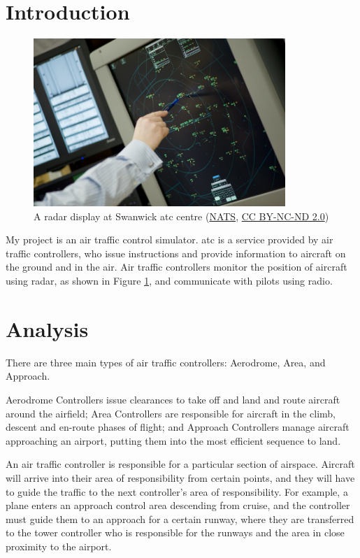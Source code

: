 \documentclass{article}
\begin{document}
\section{Introduction}
\begin{figure}[H]
\centering
\includegraphics[width=0.85\textwidth]{pictures/nats_radar.jpg}
\caption{\label{fig:radar}A radar display at Swanwick \acrshort{atc} centre (\href{https://www.nats.aero/}{NATS}, \href{https://creativecommons.org/licenses/by-nc-nd/2.0/}{CC BY-NC-ND 2.0})}
\end{figure}

My project is an air traffic control simulator.
\acrfull{atc} is a service provided by air traffic controllers, who issue instructions and provide information to aircraft on the ground and in the air.
Air traffic controllers monitor the position of aircraft using radar, as shown in Figure \ref{fig:radar}, and communicate with pilots using radio\cite{caadef}.


\section{Analysis}
There are three main types of air traffic controllers: Aerodrome, Area, and Approach.

Aerodrome Controllers issue clearances to take off and land and route aircraft around the airfield; Area Controllers are responsible for aircraft in the climb, descent and en-route phases of flight; and Approach Controllers manage aircraft approaching an airport, putting them into the most efficient sequence to land\cite{natscareers}.

An air traffic controller is responsible for a particular section of \gls{airspace}.
Aircraft will arrive into their area of responsibility from certain points, and they will have to guide the traffic to the next controller's area of responsibility.
For example, a plane enters an approach control area descending from cruise, and the controller must guide them to an approach for a certain runway, where they are transferred to the tower controller who is responsible for the runways and the area in close proximity to the airport.
\end{document}
